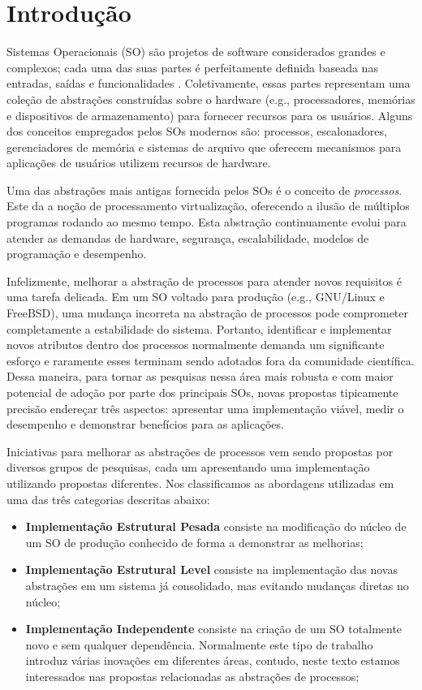 \chapter{Introdução}
\label{cap:introducao}

Sistemas Operacionais (SO) são projetos de software considerados grandes e
complexos; cada uma das suas partes é perfeitamente definida baseada nas
entradas, saídas e funcionalidades \cite{silberschatz}. Coletivamente, essas
partes representam uma coleção de abstrações construídas sobre o hardware
(e.g., processadores, memórias e dispositivos de armazenamento) para fornecer
recursos para os usuários. Alguns dos conceitos empregados pelos SOs modernos
são: processos, escalonadores, gerenciadores de memória e sistemas de arquivo
que oferecem mecanismos para aplicações de usuários utilizem recursos de
hardware.

Uma das abstrações mais antigas fornecida pelos SOs é o conceito de
\emph{processos}. Este da a noção de processamento virtualização, oferecendo a
ilusão de múltiplos programas rodando ao mesmo tempo\cite{love, tanenbaum}.
Esta abstração continuamente evolui para atender as demandas de hardware,
segurança, escalabilidade, modelos de programação e desempenho.

Infelizmente, melhorar a abstração de processos para atender novos requisitos é
uma tarefa delicada. Em um SO voltado para produção (e.g., GNU/Linux e
FreeBSD), uma mudança incorreta na abstração de processos pode comprometer
completamente a estabilidade do sistema. Portanto, identificar e implementar
novos atributos dentro dos processos normalmente demanda um significante
esforço e raramente esses terminam sendo adotados fora da comunidade
científica. Dessa maneira, para tornar as pesquisas nessa área mais robusta e
com maior potencial de adoção por parte dos principais SOs, novas propostas
tipicamente precisão endereçar três aspectos: apresentar uma implementação
viável, medir o desempenho e demonstrar benefícios para as aplicações.

Iniciativas para melhorar as abstrações de processos vem sendo propostas por
diversos grupos de pesquisas, cada um apresentando uma implementação utilizando
propostas diferentes. Nos classificamos as abordagens utilizadas em uma das
três categorias descritas abaixo:

\begin{itemize}
\item \textbf{Implementação Estrutural Pesada} consiste na modificação do núcleo
  de um SO de produção conhecido de forma a demonstrar as melhorias;
\item \textbf{Implementação Estrutural Level} consiste na implementação das
  novas abstrações em um sistema já consolidado, mas evitando mudanças diretas
  no núcleo;
\item \textbf{Implementação Independente} consiste na criação de um SO
  totalmente novo e sem qualquer dependência. Normalmente este tipo de trabalho
  introduz várias inovações em diferentes áreas, contudo, neste texto estamos
  interessados nas propostas relacionadas as abstrações de processos;
\end{itemize}

